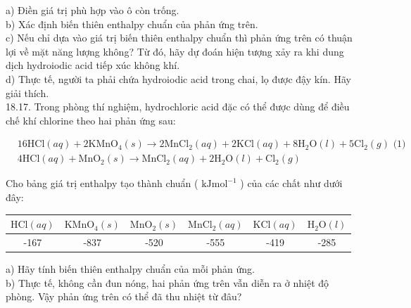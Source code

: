 \documentclass[10pt]{article}
\begin{document}
a) Điền giá trị phù hợp vào ô còn trống.\\
b) Xác định biến thiên enthalpy chuẩn của phản ứng trên.\\
c) Nếu chỉ dựa vào giá trị biến thiên enthalpy chuẩn thì phản ứng trên có thuận lợi về mặt năng lượng không? Từ đó, hãy dự đoán hiện tượng xảy ra khi dung dịch hydroiodic acid tiếp xúc không khí.\\
d) Thực tế, người ta phải chứa hydroiodic acid trong chai, lọ được đậy kín. Hãy giải thích.\\
18.17. Trong phòng thí nghiệm, hydrochloric acid đặc có thể được dùng để điều chế khí chlorine theo hai phản ứng sau:


\begin{align*}
& 16 \mathrm{HCl}(a q)+2 \mathrm{KMnO}_{4}(s) \rightarrow 2 \mathrm{MnCl}_{2}(a q)+2 \mathrm{KCl}(a q)+8 \mathrm{H}_{2} \mathrm{O}(l)+5 \mathrm{Cl}_{2}(g) \text { (1) } \\
& 4 \mathrm{HCl}(a q)+\mathrm{MnO}_{2}(s) \rightarrow \mathrm{MnCl}_{2}(a q)+2 \mathrm{H}_{2} \mathrm{O}(l)+\mathrm{Cl}_{2}(g) \tag{2}
\end{align*}


Cho bảng giá trị enthalpy tạo thành chuẩn ( $\mathrm{kJ} \mathrm{mol}^{-1}$ ) của các chất như dưới đây:

\begin{center}
\begin{tabular}{|c|c|c|c|c|c|}
\hline
$\mathrm{HCl}(a q)$ & $\mathrm{KMnO}_{4}(s)$ & $\mathrm{MnO}_{2}(s)$ & $\mathrm{MnCl}_{2}(a q)$ & $\mathrm{KCl}(a q)$ & $\mathrm{H}_{2} \mathrm{O}(l)$ \\
\hline
-167 & -837 & -520 & -555 & -419 & -285 \\
\hline
\end{tabular}
\end{center}

a) Hãy tính biến thiên enthalpy chuẩn của mỗi phản ứng.\\
b) Thực tế, không cần đun nóng, hai phản ứng trên vẫn diễn ra ở nhiệt độ phòng. Vậy phản ứng trên có thể đã thu nhiệt từ đâu?
\end{document}
